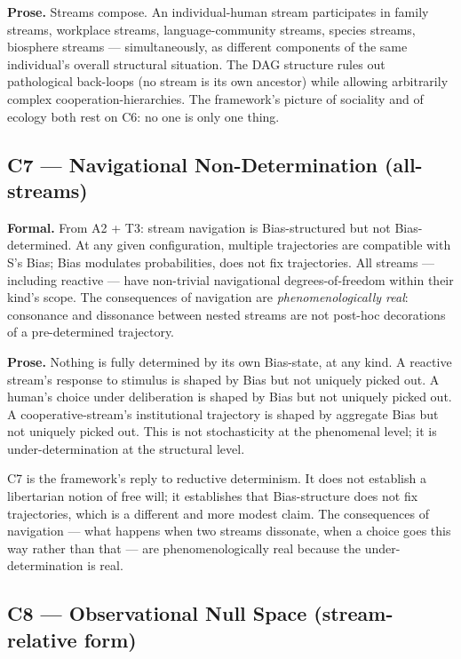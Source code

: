 \documentclass[11pt, openany]{book}
\begin{document}
\textbf{Prose.} Streams compose. An individual-human stream participates in family streams, workplace streams, language-community streams, species streams, biosphere streams --- simultaneously, as different components of the same individual's overall structural situation. The DAG structure rules out pathological back-loops (no stream is its own ancestor) while allowing arbitrarily complex cooperation-hierarchies. The framework's picture of sociality and of ecology both rest on C6: no one is only one thing.

\subsection{C7 --- Navigational Non-Determination (all-streams)}

\textbf{Formal.} From A2 + T3: stream navigation is Bias-structured but not Bias-determined. At any given configuration, multiple trajectories are compatible with S's Bias; Bias modulates probabilities, does not fix trajectories. All streams --- including reactive --- have non-trivial navigational degrees-of-freedom within their kind's scope. The consequences of navigation are \textit{phenomenologically real}: consonance and dissonance between nested streams are not post-hoc decorations of a pre-determined trajectory.

\textbf{Prose.} Nothing is fully determined by its own Bias-state, at any kind. A reactive stream's response to stimulus is shaped by Bias but not uniquely picked out. A human's choice under deliberation is shaped by Bias but not uniquely picked out. A cooperative-stream's institutional trajectory is shaped by aggregate Bias but not uniquely picked out. This is not stochasticity at the phenomenal level; it is under-determination at the structural level.

C7 is the framework's reply to reductive determinism. It does not establish a libertarian notion of free will; it establishes that Bias-structure does not fix trajectories, which is a different and more modest claim. The consequences of navigation --- what happens when two streams dissonate, when a choice goes this way rather than that --- are phenomenologically real because the under-determination is real.

\subsection{C8 --- Observational Null Space (stream-relative form)}
\end{document}

